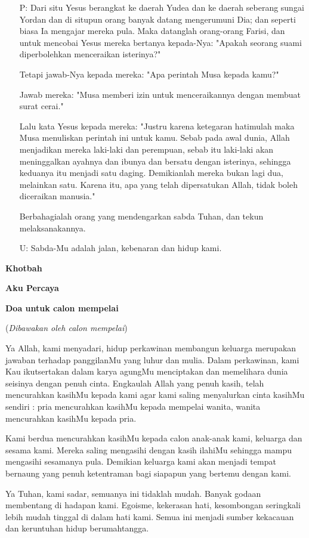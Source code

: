 \documentclass[a5paper,headsepline,titlepage,11pt,nnormalheadings]{scrartcl}
\makeatletter
\newcommand{\subjudul}[1]{%
  {\parindent \z@ \normalfont
    \interlinepenalty\@M \bfseries #1\par\nobreak \vskip 20\p@ }}
\newcommand{\BU}[1]{\begin{itemize} \item[U:] #1 \end{itemize}}
\newcommand{\BP}[1]{\begin{itemize} \item[P:] #1 \end{itemize}}
\makeatother
\begin{document}
\BP{
Dari situ Yesus berangkat ke daerah Yudea dan ke daerah seberang sungai Yordan dan di situpun orang banyak datang mengerumuni Dia; dan seperti biasa Ia mengajar mereka pula.
Maka datanglah orang-orang Farisi, dan untuk mencobai Yesus mereka bertanya kepada-Nya: "Apakah seorang suami diperbolehkan menceraikan isterinya?"

Tetapi jawab-Nya kepada mereka: "Apa perintah Musa kepada kamu?"

Jawab mereka: "Musa memberi izin untuk menceraikannya dengan membuat surat cerai."

Lalu kata Yesus kepada mereka: "Justru karena ketegaran hatimulah maka Musa menuliskan perintah ini untuk kamu.
Sebab pada awal dunia, Allah menjadikan mereka laki-laki dan perempuan,
sebab itu laki-laki akan meninggalkan ayahnya dan ibunya dan bersatu dengan isterinya,
sehingga keduanya itu menjadi satu daging. Demikianlah mereka bukan lagi dua, melainkan satu.
Karena itu, apa yang telah dipersatukan Allah, tidak boleh diceraikan manusia."

Berbahagialah orang yang mendengarkan sabda Tuhan, dan tekun melaksanakannya.}

\BU{Sabda-Mu adalah jalan, kebenaran dan hidup kami.}

\subjudul{Khotbah}

\subjudul{Aku Percaya}

\subjudul{Doa untuk calon mempelai\par
(\textit{Dibawakan oleh calon mempelai})}

Ya Allah, kami menyadari, hidup perkawinan membangun keluarga merupakan jawaban terhadap panggilanMu yang luhur dan mulia. Dalam perkawinan, kami Kau ikutsertakan dalam karya agungMu menciptakan dan memelihara dunia seisinya dengan penuh cinta. Engkaulah Allah yang penuh kasih, telah mencurahkan kasihMu kepada kami agar kami saling menyalurkan cinta kasihMu sendiri : pria mencurahkan kasihMu kepada mempelai wanita, wanita mencurahkan kasihMu kepada pria.

Kami berdua mencurahkan kasihMu kepada calon anak-anak kami, keluarga dan sesama kami. Mereka saling mengasihi dengan kasih ilahiMu sehingga mampu mengasihi sesamanya pula. Demikian keluarga kami akan menjadi tempat bernaung yang penuh ketentraman bagi siapapun yang bertemu dengan kami.

Ya Tuhan, kami sadar, semuanya ini tidaklah mudah. Banyak godaan membentang di hadapan kami. Egoisme, kekerasan hati, kesombongan seringkali lebih mudah tinggal di dalam hati kami. Semua ini menjadi sumber kekacauan dan keruntuhan hidup berumahtangga.
\end{document}
